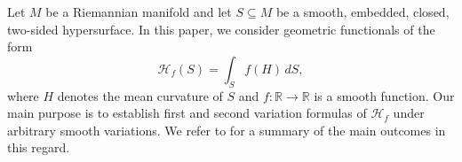 \documentclass[11pt]{amsart}
\theoremstyle{definition}
\theoremstyle{remark}
\numberwithin{equation}{section}
\begin{document}

Let $M$ be a Riemannian manifold and let $S\subseteq M$ be a smooth, embedded, closed, two-sided hypersurface. In this paper, we consider geometric functionals of the form
\begin{equation}
    \label{intro_riemfun}
\mathcal H_f(S)=\int_S f(H)\,d S,
\end{equation}
where $H$ denotes the mean curvature of $S$ and $f:\mathbb R\to\mathbb R$ is a smooth function. Our main purpose is to establish first and second variation formulas of $\mathcal H_f$ under arbitrary smooth variations. We refer to  for a summary of the main outcomes in this regard.
\end{document}
